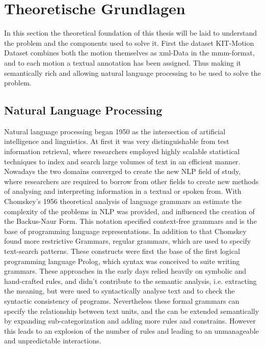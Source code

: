 \chapter{Theoretische Grundlagen}
In this section the theoretical foundation of this thesis will be laid to understand the problem and the components used to solve it. First the dataset KIT-Motion Dataset combines both the motion themselves as xml-Data in the mmm-format, and to each motion a textual annotation has been assigned. Thus making it semantically rich and allowing natural language processing to be used to solve the problem.
\section{Natural Language Processing}
Natural language processing began 1950 as the intersection of artificial intelligence and linguistics. At first it was very distinguishable from test information retrieval, where researchers employed highly scalable statistical techniques to index and search large volumes of text in an efficient manner\cite{nadkarni2011natural}. Nowadays the two domains converged to create the new NLP field of study, where researchers are required to borrow from other fields to create new methods of analysing and interpreting information in a textual or spoken from.\newline
With Chomskey's 1956 theoretical analysis of language grammars an estimate the complexity of the problems in NLP was provided, and influenced the creation of the Backus-Naur Form. This notation specified context-free grammars and is the base of programming language representations. In addition to that Chomskey found more restrictive Grammars, regular grammars, which are used to specify text-search patterns\cite{nadkarni2011natural}. These constructs were first the base of the first logical programming language Prolog, which syntax was conceived to suite writing grammars.\newline
These approaches in the early days relied heavily on symbolic and hand-crafted rules, and didn't contribute to the semantic analysis, i.e. extracting the meaning, but were used to syntactically analyse text and to check the syntactic consistency of programs. Nevertheless these formal grammars can specify the relationship between text units, and the can be extended semantically by expanding sub-categorization and adding more rules and constrains. However this leads to an explosion of the number of rules and leading to an unmanageable and unpredictable interactions\cite{nadkarni2011natural}.\newline
